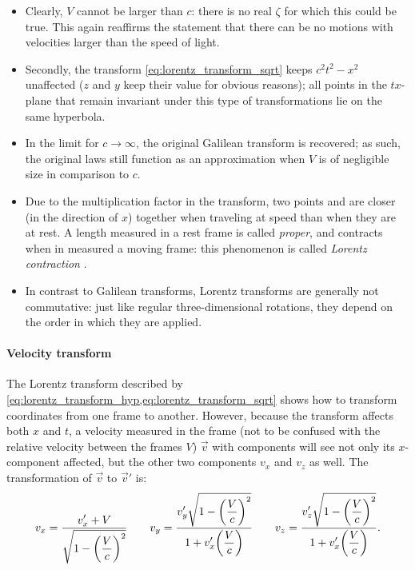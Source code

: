 \begin{itemize}
    \item Clearly, \(V\) cannot be larger than \(c\): there is no real \(\zeta\) for which this could be true. This again reaffirms the statement that there can be no motions with velocities larger than the speed of light.
    \item Secondly, the transform \cref{eq:lorentz_transform_sqrt} keeps \(c^2t^2 - x^2\) unaffected (\(z\) and \(y\) keep their value for obvious reasons); all points in the \(tx\)-plane that remain invariant under this type of transformations lie on the same hyperbola. %
    \item In the limit for \(c \to \infty\), the original Galilean transform is recovered; as such, the original laws still function as an approximation when \(V\) is of negligible size in comparison to \(c\).
    \item Due to the multiplication factor in the transform, two points and are closer (in the direction of $x$) together when traveling at speed than when they are at rest. A length measured in a rest frame is called \emph{proper}, and contracts when in measured a moving frame: this phenomenon is called \emph{Lorentz contraction}   \cite{Landau1971}.
    \item In contrast to Galilean transforms, Lorentz transforms are generally not commutative: just like regular three-dimensional rotations, they depend on the order in which they are applied.
\end{itemize}
\paragraph{Velocity transform} The Lorentz transform described by \cref{eq:lorentz_transform_hyp,eq:lorentz_transform_sqrt} shows how to transform coordinates from one frame to another. However, because the transform affects both \(x\) and \(t\), a velocity measured in the frame (not to be confused with the relative velocity between the frames \(V\)) \(\vec{v}\) with components will see not only its \(x\)-component affected, but the other two components \(v_x\) and \(v_z\) as well. The transformation of \(\vec{v}\) to \(\vec{v}'\) is: \cite{Landau1971}
\begin{equation}
    v_x = \frac{\displaystyle v_x' + V}{\displaystyle \sqrt{1 - \qty(\frac{V}{c})^2}}\qquad 
    v_y = \frac{\displaystyle v_y'\sqrt{1 - \qty(\frac{V}{c})^2}}{\displaystyle 1 + v_x'
    \qty(\frac{V}{c})}\qquad
    v_z = \frac{\displaystyle v_z'\sqrt{1 - \qty(\frac{V}{c})^2}}{\displaystyle 1 + v_x'\qty(\frac{V}{c})}.
    \label{eq:lorentz_transform_vel}
\end{equation}

